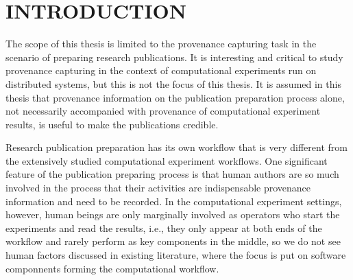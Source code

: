  
\chapter{INTRODUCTION}
The scope of this thesis is limited to the provenance capturing task in the scenario of preparing research publications. It is interesting and critical to study provenance capturing in the context of computational experiments run on distributed systems, but this is not the focus of this thesis. It is assumed in this thesis that provenance information on the publication preparation process alone, not necessarily accompanied with provenance of computational experiment results, is useful to make the publications credible.

Research publication preparation has its own workflow that is very different from the extensively studied computational experiment workflows. One significant feature of the publication preparing process is that human authors are so much involved in the process that their activities are indispensable provenance information and need to be recorded. In the computational experiment settings, however, human beings are only marginally involved as operators who start the experiments and read the results, i.e., they only appear at both ends of the workflow and rarely perform as key components in the middle, so we do not see human factors discussed in existing literature, where the focus is put on software componnents forming the computational workflow.

